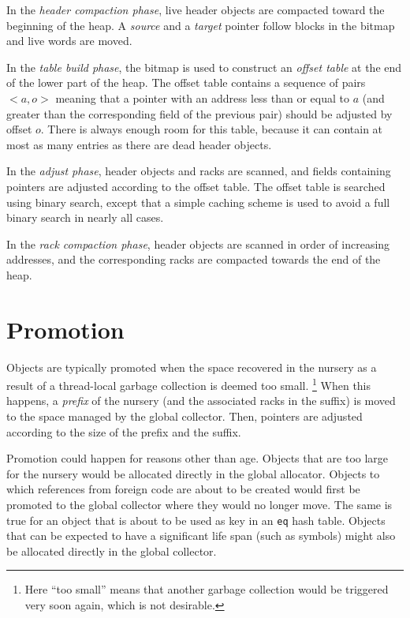 In the \emph{header compaction phase}, live header objects are compacted
toward the beginning of the heap.  A \emph{source} and a \emph{target}
pointer follow blocks in the bitmap and live words are moved. 

In the \emph{table build phase}, the bitmap is used to construct an
\emph{offset table} at the end of the lower part of the heap.  The
offset table contains a sequence of pairs $<a,o>$ meaning that a
pointer with an address less than or equal to $a$ (and greater than
the corresponding field of the previous pair) should be adjusted by
offset $o$.  There is always enough room for this table, because it
can contain at most as many entries as there are dead header objects.  

In the \emph{adjust phase}, header objects and racks are
scanned, and fields containing pointers are adjusted according to the
offset table.  The offset table is searched using binary search,
except that a simple caching scheme is used to avoid a full binary
search in nearly all cases. 

In the \emph{rack compaction phase}, header objects are scanned in
order of increasing addresses, and the corresponding racks
are compacted towards the end of the heap.

\section{Promotion}

Objects are typically promoted when the space recovered in the nursery
as a result of a thread-local garbage collection is deemed too small.%
\footnote{Here ``too small'' means that another garbage collection
  would be triggered very soon again, which is not desirable.}  When
this happens, a \emph{prefix} of the nursery (and the associated
racks in the suffix) is moved to the space managed by the
global collector.  Then, pointers are adjusted according to the size
of the prefix and the suffix. 

Promotion could happen for reasons other than age.  Objects that are
too large for the nursery would be allocated directly in the global
allocator.  Objects to which references from foreign code are
about to be created would first be promoted to the global collector
where they would no longer move.  The same is true for an object that
is about to be used as key in an \texttt{eq} hash table.  Objects that
can be expected to have a significant life span (such as symbols)
might also be allocated directly in the global collector. 

